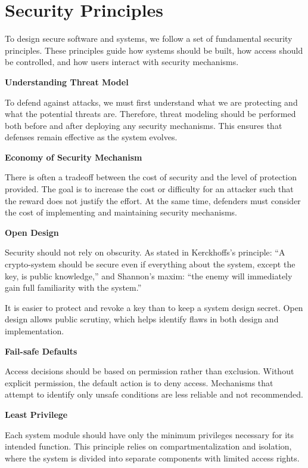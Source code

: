 \chapter{Security Principles}

To design secure software and systems, we follow a set of fundamental security principles. These principles guide how systems should be built, how access should be controlled, and how users interact with security mechanisms.

\textbf{Understanding Threat Model} 

To defend against attacks, we must first understand what we are protecting and what the potential threats are. Therefore, threat modeling should be performed both before and after deploying any security mechanisms. This ensures that defenses remain effective as the system evolves.

\textbf{Economy of Security Mechanism} 

There is often a tradeoff between the cost of security and the level of protection provided. The goal is to increase the cost or difficulty for an attacker such that the reward does not justify the effort. At the same time, defenders must consider the cost of implementing and maintaining security mechanisms.

\textbf{Open Design} 

Security should not rely on obscurity. As stated in Kerckhoffs's principle: ``A crypto-system should be secure even if everything about the system, except the key, is public knowledge,'' and Shannon’s maxim: ``the enemy will immediately gain full familiarity with the system.''

It is easier to protect and revoke a key than to keep a system design secret. Open design allows public scrutiny, which helps identify flaws in both design and implementation.

\textbf{Fail-safe Defaults} 

Access decisions should be based on permission rather than exclusion. Without explicit permission, the default action is to deny access. Mechanisms that attempt to identify only unsafe conditions are less reliable and not recommended.

\textbf{Least Privilege} 

Each system module should have only the minimum privileges necessary for its intended function. This principle relies on compartmentalization and isolation, where the system is divided into separate components with limited access rights.

